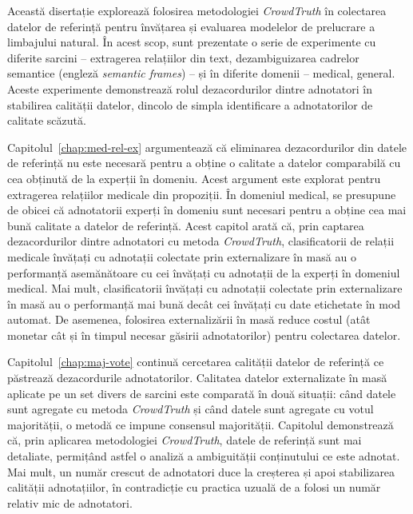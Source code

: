 Această disertație explorează folosirea metodologiei \textit{CrowdTruth} în colectarea datelor de referință pentru învățarea și evaluarea modelelor de prelucrare a limbajului natural. În acest scop, sunt prezentate o serie de experimente cu diferite sarcini -- extragerea relațiilor din text, dezambiguizarea cadrelor semantice (engleză \textit{semantic frames}) -- și în diferite domenii -- medical, general. Aceste experimente demonstrează rolul dezacordurilor dintre adnotatori în stabilirea calității datelor, dincolo de simpla identificare a adnotatorilor de calitate scăzută.

Capitolul~\ref{chap:med-rel-ex} argumentează că eliminarea dezacordurilor din datele de referință nu este necesară pentru a obține o calitate a datelor comparabilă cu cea obținută de la experții în domeniu. Acest argument este explorat pentru extragerea relațiilor medicale din propoziții. În domeniul medical, se presupune de obicei că adnotatorii experți în domeniu sunt necesari pentru a obține cea mai bună calitate a datelor de referință. Acest capitol arată că, prin captarea dezacordurilor dintre adnotatori cu metoda \textit{CrowdTruth}, clasificatorii de relații medicale învățați cu adnotații colectate prin externalizare în masă au o performanță asemănătoare cu cei învățați cu adnotații de la experți în domeniul medical. Mai mult, clasificatorii învățați cu adnotații colectate prin externalizare în masă au o performanță mai bună decât cei învățați cu date etichetate în mod automat. De asemenea, folosirea externalizării în masă reduce costul (atât monetar cât și în timpul necesar găsirii adnotatorilor) pentru colectarea datelor.

Capitolul~\ref{chap:maj-vote} continuă cercetarea calității datelor de referință ce păstrează dezacordurile adnotatorilor. Calitatea datelor externalizate în masă aplicate pe un set divers de sarcini este comparată în două situații: când datele sunt agregate cu metoda \textit{CrowdTruth} și când datele sunt agregate cu votul majorității, o metodă ce impune consensul majorității. Capitolul demonstrează că, prin aplicarea metodologiei \textit{CrowdTruth}, datele de referință sunt mai detaliate, permițând astfel o analiză a ambiguității conținutului ce este adnotat. Mai mult, un număr crescut de adnotatori duce la creșterea și apoi stabilizarea calității adnotațiilor, în contradicție cu practica uzuală de a folosi un număr relativ mic de adnotatori.

